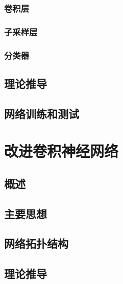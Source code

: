 \documentclass[bachelor,zhspacing]{cqu}  %
\begin{document}
\subsubsection{卷积层}\label{ux5377ux79efux5c42}

\subsubsection{子采样层}\label{ux5b50ux91c7ux6837ux5c42}

\subsubsection{分类器}\label{ux5206ux7c7bux5668}

\subsection{理论推导}\label{ux7406ux8bbaux63a8ux5bfc}

\subsection{网络训练和测试}\label{ux7f51ux7edcux8badux7ec3ux548cux6d4bux8bd5}

\section{改进卷积神经网络}\label{ux6539ux8fdbux5377ux79efux795eux7ecfux7f51ux7edc}

\subsection{概述}\label{ux6982ux8ff0-1}

\subsection{主要思想}\label{ux4e3bux8981ux601dux60f3}

\subsection{网络拓扑结构}\label{ux7f51ux7edcux62d3ux6251ux7ed3ux6784-1}

\subsection{理论推导}\label{ux7406ux8bbaux63a8ux5bfc-1}
\end{document}
